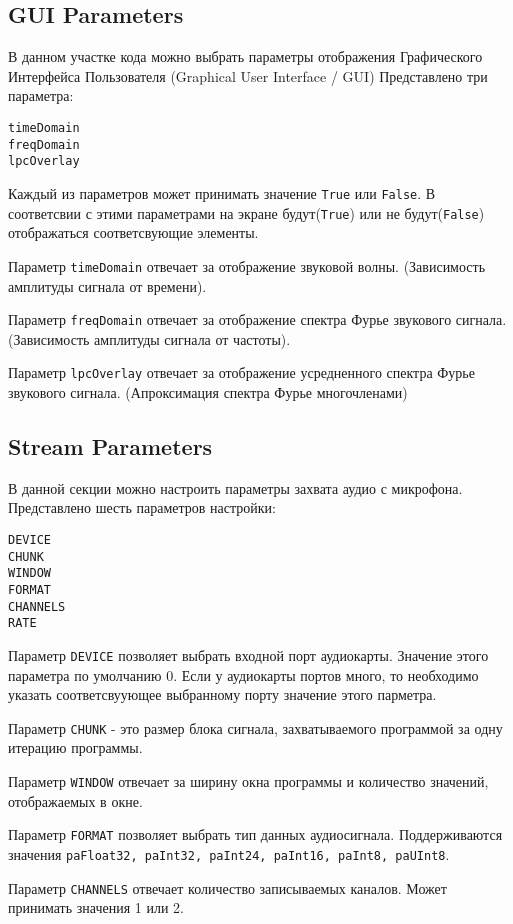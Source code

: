 \subsection{GUI Parameters}
В данном участке кода можно выбрать параметры отображения Графического Интерфейса Пользователя (Graphical User Interface / GUI)
Представлено три параметра:
\begin{verbatim}
timeDomain
freqDomain
lpcOverlay
\end{verbatim}

Каждый из параметров может принимать значение \verb|True| или \verb|False|. В соответсвии с этими параметрами на экране будут(\verb|True|) или не будут(\verb|False|) отображаться соответсвующие элементы.

Параметр \verb|timeDomain| отвечает за отображение звуковой волны. (Зависимость амплитуды сигнала от времени). 

Параметр \verb|freqDomain| отвечает за отображение спектра Фурье звукового сигнала. (Зависимость амплитуды сигнала от частоты). 

Параметр \verb|lpcOverlay| отвечает за отображение усредненного спектра Фурье звукового сигнала. (Апроксимация спектра Фурье многочленами)

\subsection{Stream Parameters}
В данной секции можно настроить параметры захвата аудио с микрофона. Представлено шесть параметров настройки:
\begin{verbatim}
DEVICE
CHUNK
WINDOW
FORMAT
CHANNELS
RATE
\end{verbatim}

Параметр \verb|DEVICE| позволяет выбрать входной порт аудиокарты. Значение этого параметра по умолчанию 0. Если у аудиокарты портов много, то необходимо указать соответсвуующее выбранному  порту значение этого парметра. 

Параметр \verb|CHUNK| - это размер блока сигнала, захватываемого программой за одну итерацию программы. 

Параметр \verb|WINDOW| отвечает за ширину окна программы и количество значений, отображаемых в окне.

Параметр \verb|FORMAT| позволяет выбрать тип данных аудиосигнала. Поддерживаются значения  \verb|paFloat32, paInt32, paInt24, paInt16, paInt8, paUInt8|.

Параметр \verb|CHANNELS| отвечает количество записываемых каналов. Может принимать значения 1 или 2. 

